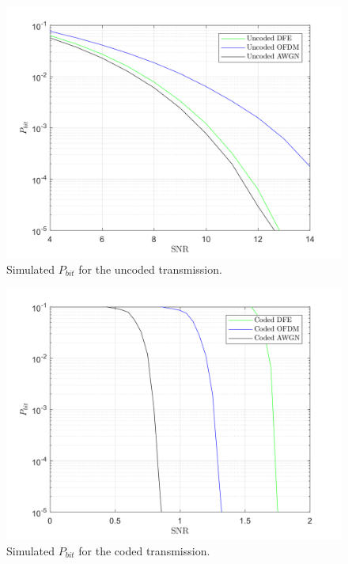 \documentclass[a4paper, 12pt]{report}
\begin{document}
\begin{figure}[H]
	\centering
	\includegraphics[width=14cm]{uncoded}
	\caption{Simulated $P_{bit}$ for the uncoded transmission.}\label{uncoded}
\end{figure}

\begin{figure}[H]
	\centering
	\includegraphics[width=14cm]{coded}
	\caption{Simulated $P_{bit}$ for the coded transmission.}\label{coded}
\end{figure}



%	
%		
%	
%		
%		
%	
\end{document}
